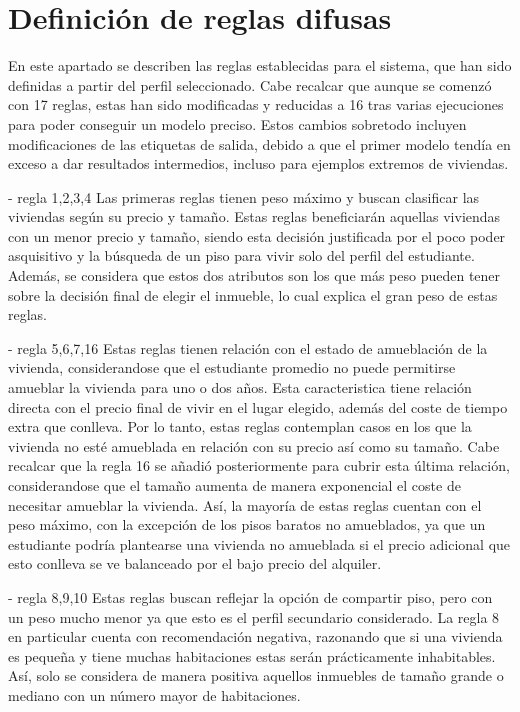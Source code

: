 \documentclass[12pt]{report} %
\begin{document}
    \section{Definición de reglas difusas}

    En este apartado se describen las reglas establecidas para el sistema, que
    han sido definidas a partir del perfil seleccionado. Cabe recalcar que
    aunque se comenzó con 17 reglas, estas han sido modificadas y reducidas a
    16 tras varias ejecuciones para poder conseguir un modelo preciso. Estos
    cambios sobretodo incluyen modificaciones de las etiquetas de salida,
    debido a que el primer modelo tendía en exceso a dar resultados intermedios,
    incluso para ejemplos extremos de viviendas.

    - regla 1,2,3,4
    Las primeras reglas tienen peso máximo y buscan clasificar las viviendas según su precio 
    y tamaño. Estas reglas beneficiarán aquellas viviendas con un menor precio y tamaño, siendo 
    esta decisión justificada por el poco poder asquisitivo y la búsqueda de un piso para vivir solo
    del perfil del estudiante. Además, se considera que estos dos atributos son los que más peso 
    pueden tener sobre la decisión final de elegir el inmueble, lo cual explica el gran peso de 
    estas reglas.

    - regla 5,6,7,16
    Estas reglas tienen relación con el estado de amueblación de la vivienda, considerandose que el 
    estudiante promedio no puede permitirse amueblar la vivienda para uno o dos años. 
    Esta caracteristica tiene relación directa con el precio final de vivir en el lugar elegido, 
    además del coste de tiempo extra que conlleva. Por lo tanto, estas reglas contemplan casos en 
    los que la vivienda no esté amueblada en relación con su precio así como su tamaño. Cabe recalcar
    que la regla 16 se añadió posteriormente para cubrir esta última relación, considerandose que el 
    tamaño aumenta de manera exponencial el coste de necesitar amueblar la vivienda. Así, la mayoría 
    de estas reglas cuentan con el peso máximo, con la excepción de los pisos baratos no amueblados, ya que un
    estudiante podría plantearse una vivienda no amueblada si el precio adicional que esto conlleva 
    se ve balanceado por el bajo precio del alquiler.

    - regla 8,9,10
    Estas reglas buscan reflejar la opción de compartir piso, pero con un peso mucho menor ya que esto 
    es el perfil secundario considerado. La regla 8 en particular cuenta con recomendación negativa, 
    razonando que si una vivienda es pequeña y tiene muchas habitaciones estas serán prácticamente 
    inhabitables. Así, solo se considera de manera positiva aquellos inmuebles de tamaño grande o mediano
    con un número mayor de habitaciones.
\end{document}

